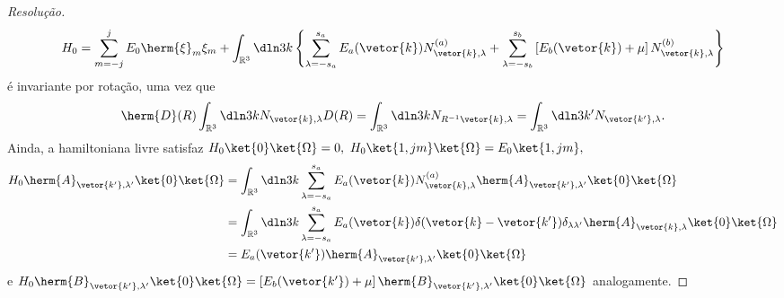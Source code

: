 \begin{proof}[Resolução]
\begin{equation*}
      H_0 = \sum_{m = -j}^{j} E_0\herm{\xi}_m\xi_m + \int_{\mathbb{R}^3} \dln3{k} \left\{\sum_{\lambda = -s_a}^{s_a} E_a(\vetor{k}) N^{(a)}_{\vetor{k}, \lambda} + \sum_{\lambda = -s_b}^{s_b} \left[E_{b}(\vetor{k}) + \mu\right] N_{\vetor{k}, \lambda}^{(b)}\right\}
   \end{equation*}
   é invariante por rotação, uma vez que
   \begin{equation*}
      \herm{D}(R) \int_{\mathbb{R}^3} \dln3k N_{\vetor{k}, \lambda} D(R) = \int_{\mathbb{R}^3} \dln3k N_{R^{-1}\vetor{k}, \lambda} = \int_{\mathbb{R}^3} \dln3{k'} N_{\vetor{k'}, \lambda}.
   \end{equation*}
   Ainda, a hamiltoniana livre satisfaz \(H_0 \ket{0}\ket{\Omega} = 0,\) \(H_0 \ket{1,jm}\ket{\Omega} = E_0 \ket{1,jm},\)
   \begin{align*}
      H_0 \herm{A}_{\vetor{k'}, \lambda'}\ket{0}\ket{\Omega} 
      &= \int_{\mathbb{R}^3} \dln3k \sum_{\lambda = -s_a}^{s_a} E_a(\vetor{k}) N^{(a)}_{\vetor{k}, \lambda}\herm{A}_{\vetor{k'}, \lambda'}\ket{0}\ket{\Omega}\\
      &= \int_{\mathbb{R}^3} \dln3k \sum_{\lambda = -s_a}^{s_a} E_a(\vetor{k}) \delta(\vetor{k} - \vetor{k'})\delta_{\lambda\lambda'}\herm{A}_{\vetor{k}, \lambda}\ket{0}\ket{\Omega}\\
      &= E_a(\vetor{k'})\herm{A}_{\vetor{k'},\lambda'}\ket{0}\ket{\Omega}
   \end{align*}
   e \(H_0 \herm{B}_{\vetor{k'}, \lambda'}\ket{0}\ket{\Omega} = \left[E_b(\vetor{k'}) + \mu\right]\herm{B}_{\vetor{k'}, \lambda'}\ket{0}\ket{\Omega}\) analogamente. 


\end{proof}
